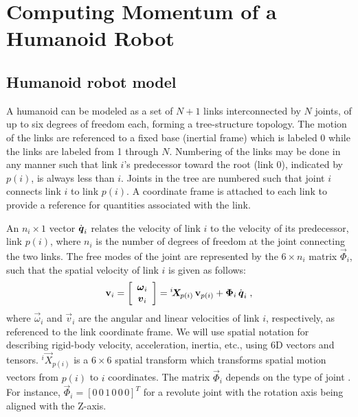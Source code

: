 \documentclass{llncs}
\newcommand{\bq}{\mbox{\boldmath $q$}}
\newcommand{\vPhi}{\vec{\Phi}}
\newcommand{\vomega}{\vec{\omega}}
\newcommand{\vq}{\vec{q}}
\newcommand{\vqd}{\dot{\vq}}
\newcommand{\vv}{\vec{v}}
\newcommand{\bv}{{\bf v}}
\newcommand{\vX}{\vec{X}}
\newcommand{\XM}[2]{{}^{#1}\!\vX_{\!#2}}
\begin{document}
\section{Computing Momentum of a Humanoid Robot}


\subsection{Humanoid robot model}
\label{sn}

A humanoid can be modeled as a set of $N+1$ links interconnected by $N$ joints,
of up to six degrees of freedom each, forming a tree-structure topology.
The motion of the links are referenced to a fixed base (inertial frame)
which is labeled 0 while the links are labeled from 1 through $N$.
Numbering of the links may be done in any manner such that link $i$'s
predecessor toward the root (link 0), indicated by $p(i)$, is always
less than $i$.  Joints in the tree are numbered such that joint $i$
connects link $i$ to link $p(i)$.  A coordinate frame is attached to each
link to provide a reference for quantities associated with the link.

An $n_i \times 1$ vector $\dot{\bq}_i$ relates the velocity of link $i$
to the velocity of its predecessor, link $p(i)$, where $n_i$ is the number
of degrees of freedom at the joint connecting the two links.  The free
modes of the joint are represented by the $6 \times n_i$ matrix
$\vPhi_i$, such that the spatial velocity of link $i$ is given as
follows:
%
%
\begin{equation}
\label{eq:spatialvelocity}
\bv_i =        \left[ \begin{array}{c} \vomega_i \\ \vv_i \end{array} \right] =
\XM{i}{p(i)} \, \bv_{p(i)} + \vPhi_i \, \vqd_i \; ,
\end{equation}
%
where $\vomega_i$ and $\vv_i$ are the angular and linear velocities
of link $i$, respectively, as referenced to the
link coordinate frame.
We will use spatial notation \cite{FeOr08,Featherstone87} for describing rigid-body velocity, acceleration, inertia, etc., using 6D vectors and tensors.
$\XM{i}{p(i)}$ is a $6 \times 6$ spatial
transform which transforms spatial motion vectors from $p(i)$ to $i$
coordinates.  The matrix $\vPhi_i$ depends on the type of joint
\cite{FeOr08}. %
For instance, $\vPhi_i = \left[ 0 \, 0 \, 1 \, 0 \, 0 \, 0 \right]^T$ for a
revolute joint with the rotation axis being aligned with the Z-axis. 
\end{document}
